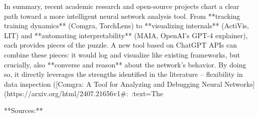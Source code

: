 In summary, recent academic research and open-source projects chart a clear path toward a more intelligent neural network analysis tool. From **tracking training dynamics** (Comgra, TorchLens) to **visualizing internals** (ActiVis, LIT) and **automating interpretability** (MAIA, OpenAI’s GPT-4 explainer), each provides pieces of the puzzle. A new tool based on ChatGPT APIs can combine these pieces: it would log and visualize like existing frameworks, but crucially, also **converse and reason** about the network’s behavior. By doing so, it directly leverages the strengths identified in the literature – flexibility in data inspection ([Comgra: A Tool for Analyzing and Debugging Neural Networks](https://arxiv.org/html/2407.21656v1#:~:text=The%

**Sources:**

